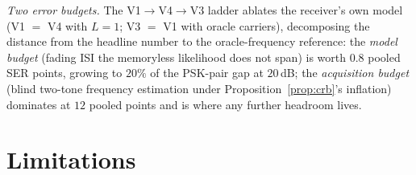\documentclass[journal]{IEEEtran}
\begin{document}
\emph{Two error budgets.} The
V1$\to$V4$\to$V3 ladder ablates the receiver's
own model (V1 $=$ V4 with $L{=}1$; V3 $=$ V1 with oracle carriers),
decomposing the distance from the headline number to the
oracle-frequency reference:
the \emph{model budget} (fading ISI the memoryless
likelihood does not span) is worth $0.8$ pooled SER points, growing to
$20\%$ of the PSK-pair gap at $20$\,dB; the \emph{acquisition budget}
(blind two-tone frequency estimation under
Proposition~\ref{prop:crb}'s inflation) dominates at $12$ pooled points
and is where any further headroom lives.

\section{Limitations}
\label{sec:lim}
\end{document}
